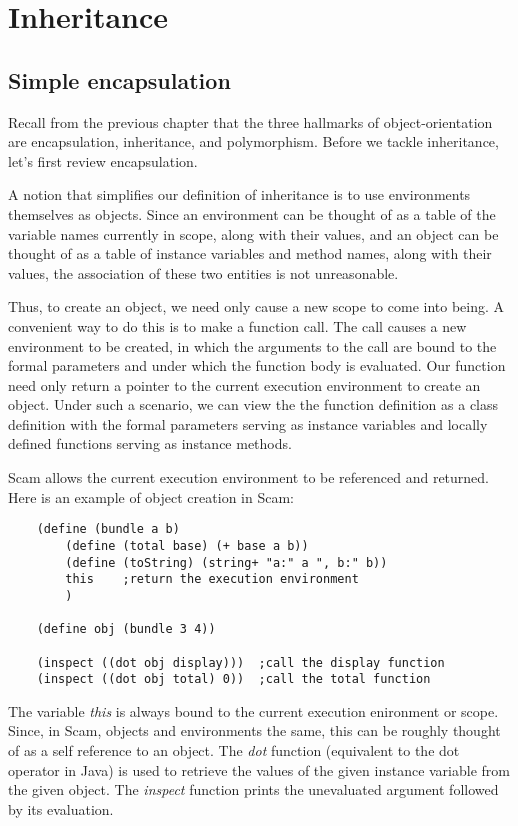 \chapter{Inheritance}
\label{Inheritance}

\section{Simple encapsulation}

Recall from the previous chapter that the three hallmarks
of object-orientation are encapsulation, inheritance, and
polymorphism. Before we tackle inheritance, let's first review encapsulation.

A notion that simplifies our definition of inheritance is to use
environments themselves as objects. Since an environment can be thought
of as a table of the variable names currently in scope, along with their
values, and an object can be thought of as a table of instance variables
and method names, along with their values, the association of these two
entities is not unreasonable.

Thus, to create an object, we need only cause a new scope to come into
being. A convenient way to do this is to make a function call. The call
causes a new environment to be created, in which the arguments to the
call are bound to the formal parameters and under which the function body
is evaluated. Our function need only return a pointer to the current
execution environment to create an object.  Under such a scenario, we
can view the the function definition as a class definition with the
formal parameters serving as instance variables and locally defined
functions serving as instance methods.  

Scam 
allows the current execution environment
to be referenced and returned.
Here is an example of object creation in Scam:

\begin{verbatim}
    (define (bundle a b)
        (define (total base) (+ base a b))
        (define (toString) (string+ "a:" a ", b:" b))
        this    ;return the execution environment
        )

    (define obj (bundle 3 4))

    (inspect ((dot obj display)))  ;call the display function
    (inspect ((dot obj total) 0))  ;call the total function
\end{verbatim}

The variable {\it this} is always bound to the current execution
enironment or scope. Since, in Scam, objects and environments the same,
this can be roughly thought of as a self reference to an object. The
{\it dot} function (equivalent to the dot operator in Java) is used to
retrieve the values of the given instance variable from the given object.
The {\it inspect} function prints the unevaluated argument followed by
its evaluation.

